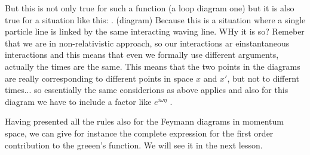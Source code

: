 \documentclass[../main/main.tex]{subfiles}
\begin{document}
\begin{itemize}
But this is not only true for such a function (a loop diagram one) but it is also true for a situation like this:
. (diagram)
Because this is a situation where a single particle line is linked by the same interacting waving line. WHy it is so? Remeber that we are in non-relativistic approach, so our interactions ar einstantaneous interactions and this means that even we formally use different arguments, actually the times are the same. This means that the  two points in the diagrams are really corresponding to different points in space \( x \) and \( x' \), but not to differnt times... so essentially the same considerions as above applies and also for this diagram we have to include a factor like \( e^{i \omega \eta }  \) .






Having presented all the rules also for the Feymann diagrams in momentum space, we can give for instance the complete expression for the first order contribution to the greeen's function. We will see it in the next lesson.





\end{itemize}
\end{document}
